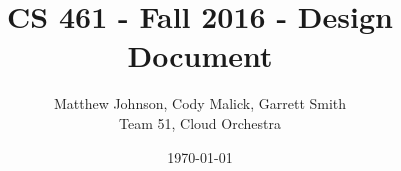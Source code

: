 \documentclass[10pt,letterpaper,onecolumn,journal]{IEEEtran}
\begin{document}
\begin{titlepage}
	\title{CS 461 - Fall 2016 - Design Document}
	\author{Matthew Johnson, Cody Malick, Garrett Smith\\
		Team 51, Cloud Orchestra}
	\date{\today}
	\maketitle
	\vspace{4cm}
	\begin{abstract}
		\noindent
	\end{abstract}

\end{titlepage}
\tableofcontents
\clearpage

\cite{ciao}



\end{document}
